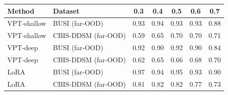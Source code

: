 \begin{tabular}{llccccc}
\toprule
Method & Dataset & 0.3 & 0.4 & 0.5 & 0.6 & 0.7 \\
\midrule
VPT-shallow & BUSI (far-OOD) & 0.93 & 0.94 & 0.93 & 0.93 & 0.88 \\
VPT-shallow & CBIS-DDSM (far-OOD) & 0.59 & 0.65 & 0.70 & 0.70 & 0.71 \\
VPT-deep & BUSI (far-OOD) & 0.92 & 0.90 & 0.92 & 0.90 & 0.84 \\
VPT-deep & CBIS-DDSM (far-OOD) & 0.62 & 0.65 & 0.66 & 0.68 & 0.70 \\
LoRA & BUSI (far-OOD) & 0.97 & 0.94 & 0.95 & 0.93 & 0.90 \\
LoRA & CBIS-DDSM (far-OOD) & 0.81 & 0.82 & 0.82 & 0.77 & 0.73 \\
\bottomrule
\end{tabular}

